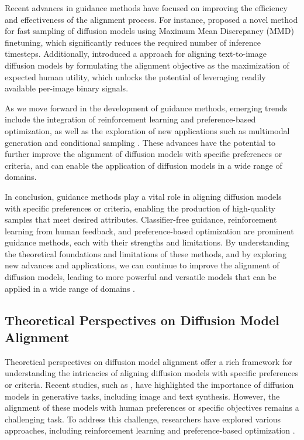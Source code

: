 \documentclass[11pt,a4paper]{article}
\begin{document}
Recent advances in guidance methods have focused on improving the efficiency and effectiveness of the alignment process. For instance, \cite{doi:10.1109/access.2024.3436698} proposed a novel method for fast sampling of diffusion models using Maximum Mean Discrepancy (MMD) finetuning, which significantly reduces the required number of inference timesteps. Additionally, \cite{arxiv:2404.04465} introduced a approach for aligning text-to-image diffusion models by formulating the alignment objective as the maximization of expected human utility, which unlocks the potential of leveraging readily available per-image binary signals.

As we move forward in the development of guidance methods, emerging trends include the integration of reinforcement learning and preference-based optimization, as well as the exploration of new applications such as multimodal generation and conditional sampling \cite{arxiv:2410.00083}. These advances have the potential to further improve the alignment of diffusion models with specific preferences or criteria, and can enable the application of diffusion models in a wide range of domains.

In conclusion, guidance methods play a vital role in aligning diffusion models with specific preferences or criteria, enabling the production of high-quality samples that meet desired attributes. Classifier-free guidance, reinforcement learning from human feedback, and preference-based optimization are prominent guidance methods, each with their strengths and limitations. By understanding the theoretical foundations and limitations of these methods, and by exploring new advances and applications, we can continue to improve the alignment of diffusion models, leading to more powerful and versatile models that can be applied in a wide range of domains \cite{arxiv:2408.10207}.


\subsection{Theoretical Perspectives on Diffusion Model Alignment}


Theoretical perspectives on diffusion model alignment offer a rich framework for understanding the intricacies of aligning diffusion models with specific preferences or criteria. Recent studies, such as \cite{doi:10.1145/3626235}, have highlighted the importance of diffusion models in generative tasks, including image and text synthesis. However, the alignment of these models with human preferences or specific objectives remains a challenging task. To address this challenge, researchers have explored various approaches, including reinforcement learning \cite{arxiv:2305.13301} and preference-based optimization \cite{doi:10.1007/978-3-031-72970-6_2}.
\end{document}
